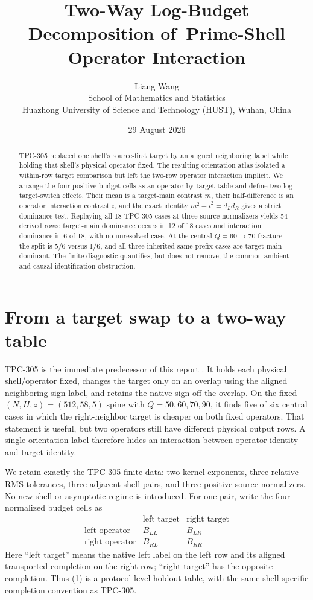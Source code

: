 \documentclass[11pt]{article}
\title{Two-Way Log-Budget Decomposition of\
Prime-Shell Operator Interaction}
\author{Liang Wang\\
School of Mathematics and Statistics\\
Huazhong University of Science and Technology (HUST), Wuhan, China}
\date{29 August 2026}
\begin{document}
\maketitle

\begin{abstract}
TPC-305 replaced one shell's source-first target by an aligned neighboring
label while holding that shell's physical operator fixed.  The resulting
orientation atlas isolated a within-row target comparison but left the
two-row operator interaction implicit.  We arrange the four positive budget
cells as an operator-by-target table and define two log target-switch effects.
Their mean is a target-main contrast $m$, their half-difference is an operator
interaction contrast $i$, and the exact identity
$m^2-i^2=d_Ld_R$ gives a strict dominance test.  Replaying all 18 TPC-305
cases at three source normalizers yields 54 derived rows: target-main
dominance occurs in 12 of 18 cases and interaction dominance in 6 of 18, with
no unresolved case.  At the central $Q=60\to70$ fracture the split is 5/6
versus 1/6, and all three inherited same-prefix cases are target-main
dominant.  The finite diagnostic quantifies, but does not remove, the
common-ambient and causal-identification obstruction.
\end{abstract}

\section{From a target swap to a two-way table}

TPC-305 is the immediate predecessor of this report \cite{tpc305}.  It holds each physical
shell/operator fixed, changes the target only on an overlap using the aligned
neighboring sign label, and retains the native sign off the overlap.  On the
fixed $(N,H,z)=(512,58,5)$ spine with $Q=50,60,70,90$, it finds five of six
central cases in which the right-neighbor target is cheaper on both fixed
operators.  That statement is useful, but two operators still have different
physical output rows.  A single orientation label therefore hides an
interaction between operator identity and target identity.

We retain exactly the TPC-305 finite data: two kernel exponents, three
relative RMS tolerances, three adjacent shell pairs, and three positive source
normalizers.  No new shell or asymptotic regime is introduced.  For one pair,
write the four normalized budget cells as
\[
\begin{array}{c|cc}
 & \text{left target} & \text{right target}\\ \hline
\text{left operator} & B_{LL} & B_{LR}\\
\text{right operator} & B_{RL} & B_{RR}
\end{array}                                                     \tag{1}
\]
Here ``left target'' means the native left label on the left row and its
aligned transported completion on the right row; ``right target'' has the
opposite completion.  Thus (1) is a protocol-level holdout table, with the
same shell-specific completion convention as TPC-305.
\end{document}
